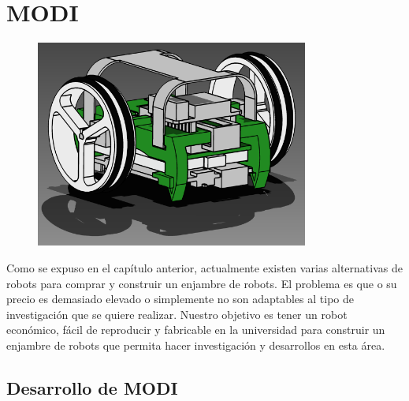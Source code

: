 
\chapter{MODI} %

\label{Chapter5} %


\begin{figure}[htbp]
	\centering
		\includegraphics[width=0.8\textwidth]{./Figures/MODI/render.png}
	\label{fig:MODI}
\end{figure}

Como se expuso en el capítulo anterior, actualmente existen varias alternativas de robots para comprar y construir un enjambre de robots. El problema es que o su precio es demasiado elevado o simplemente no son adaptables al tipo de investigación que se quiere realizar. Nuestro objetivo es tener un robot económico, fácil de reproducir y fabricable en la universidad para construir un enjambre de robots que permita hacer investigación y desarrollos en esta área.

\section{Desarrollo de MODI}

